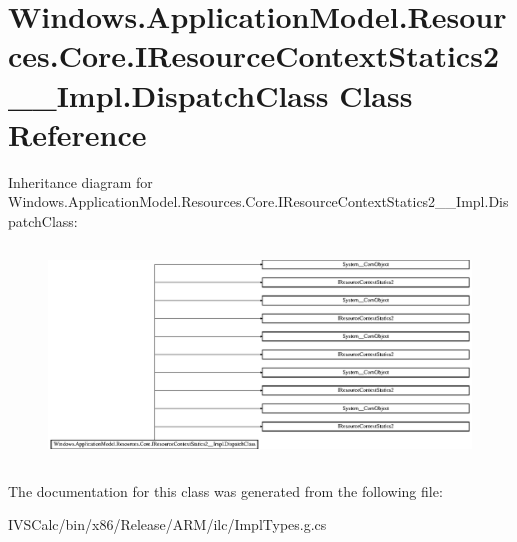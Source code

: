 \hypertarget{class_windows_1_1_application_model_1_1_resources_1_1_core_1_1_i_resource_context_statics2_____impl_1_1_dispatch_class}{}\section{Windows.\+Application\+Model.\+Resources.\+Core.\+I\+Resource\+Context\+Statics2\+\_\+\+\_\+\+Impl.\+Dispatch\+Class Class Reference}
\label{class_windows_1_1_application_model_1_1_resources_1_1_core_1_1_i_resource_context_statics2_____impl_1_1_dispatch_class}
Inheritance diagram for Windows.\+Application\+Model.\+Resources.\+Core.\+I\+Resource\+Context\+Statics2\+\_\+\+\_\+\+Impl.\+Dispatch\+Class\+:\begin{figure}[H]
\begin{center}
\leavevmode
\includegraphics[height=5.757010cm]{class_windows_1_1_application_model_1_1_resources_1_1_core_1_1_i_resource_context_statics2_____impl_1_1_dispatch_class}
\end{center}
\end{figure}


The documentation for this class was generated from the following file\+:\begin{DoxyCompactItemize}
\item 
I\+V\+S\+Calc/bin/x86/\+Release/\+A\+R\+M/ilc/Impl\+Types.\+g.\+cs\end{DoxyCompactItemize}
